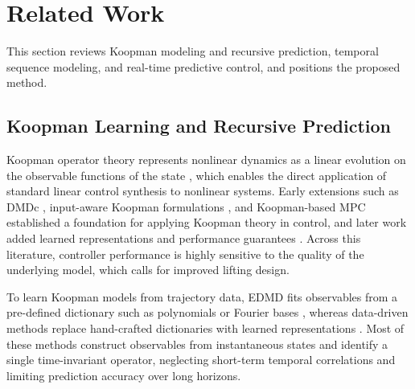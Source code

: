 \section{Related Work}
\label{sec:related_work}

This section reviews Koopman modeling and recursive prediction, temporal sequence modeling, and real-time predictive control, and positions the proposed method.

\subsection{Koopman Learning and Recursive Prediction}

Koopman operator theory represents nonlinear dynamics as a linear evolution on the observable functions of the state \cite{koopman1931hamiltonian, koopman1932spectra, mezic2005spectral}, which enables the direct application of standard linear control synthesis to nonlinear systems. Early extensions such as DMDc \cite{proctor2016dmdc}, input-aware Koopman formulations \cite{proctor2018generalizing, brunton2016invariant}, and Koopman-based MPC \cite{korda2018linear} established a foundation for applying Koopman theory in control, and later work added learned representations and performance guarantees \cite{han2020deep, shi2022deep, strasser2026overview, duran2025control}. Across this literature, controller performance is highly sensitive to the quality of the underlying model, which calls for improved lifting design.

To learn Koopman models from trajectory data, EDMD fits observables from a pre-defined dictionary such as polynomials or Fourier bases \cite{williams2015data, williams2015kernel, klus2018data}, whereas data-driven methods replace hand-crafted dictionaries with learned representations \cite{takeishi2017koopman, lusch2018deep, yeung2019learning, morton2019deep, yuan2022variational}. Most of these methods construct observables from instantaneous states and identify a single time-invariant operator, neglecting short-term temporal correlations and limiting prediction accuracy over long horizons.

